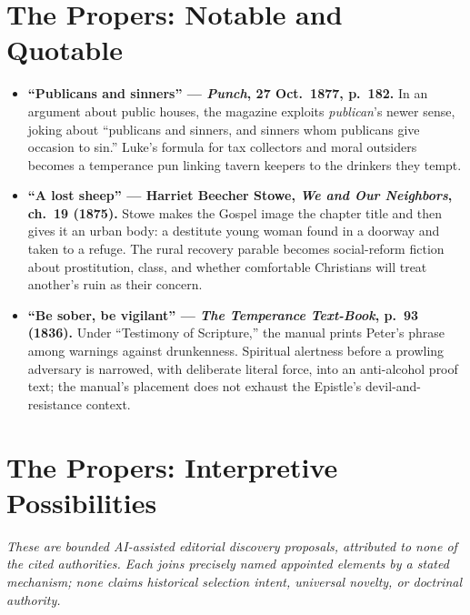 \section*{The Propers: Notable and Quotable}

{\small
\begin{itemize}
\item \textbf{``Publicans and sinners'' --- \emph{Punch}, 27 Oct.~1877, p.~182.} In an argument about public houses, the magazine exploits \emph{publican}'s newer sense, joking about ``publicans and sinners, and sinners whom publicans give occasion to sin.'' Luke's formula for tax collectors and moral outsiders becomes a temperance pun linking tavern keepers to the drinkers they tempt.

\item \textbf{``A lost sheep'' --- Harriet Beecher Stowe, \emph{We and Our Neighbors}, ch.~19 (1875).} Stowe makes the Gospel image the chapter title and then gives it an urban body: a destitute young woman found in a doorway and taken to a refuge. The rural recovery parable becomes social-reform fiction about prostitution, class, and whether comfortable Christians will treat another's ruin as their concern.

\item \textbf{``Be sober, be vigilant'' --- \emph{The Temperance Text-Book}, p.~93 (1836).} Under ``Testimony of Scripture,'' the manual prints Peter's phrase among warnings against drunkenness. Spiritual alertness before a prowling adversary is narrowed, with deliberate literal force, into an anti-alcohol proof text; the manual's placement does not exhaust the Epistle's devil-and-resistance context.
\end{itemize}
}

\section*{The Propers: Interpretive Possibilities}

\noindent\emph{These are bounded AI-assisted editorial discovery proposals, attributed to none of the cited authorities. Each joins precisely named appointed elements by a stated mechanism; none claims historical selection intent, universal novelty, or doctrinal authority.}


